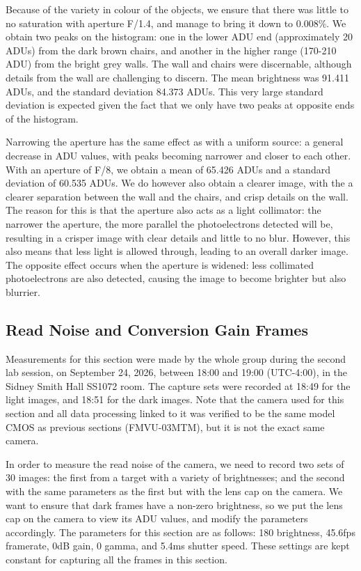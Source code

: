 \documentclass[preprint2]{aastex702}
\begin{document}
			Because of the variety in colour of the objects, we ensure that there was little to no saturation with aperture F/1.4, and manage to bring it down to 0.008\%. We obtain two peaks on the histogram: one in the lower ADU end (approximately 20 ADUs) from the dark brown chairs, and another in the higher range (170-210 ADU) from the bright grey walls. The wall and chairs were discernable, although details from the wall are challenging to discern. The mean brightness was 91.411 ADUs, and the standard deviation 84.373 ADUs. This very large standard deviation is expected given the fact that we only have two peaks at opposite ends of the histogram.

			Narrowing the aperture has the same effect as with a uniform source: a general decrease in ADU values, with peaks becoming narrower and closer to each other. With an aperture of F/8, we obtain a mean of 65.426 ADUs and a standard deviation of 60.535 ADUs. We do however also obtain a clearer image, with the a clearer separation between the wall and the chairs, and crisp details on the wall. The reason for this is that the aperture also acts as a light collimator: the narrower the aperture, the more parallel the photoelectrons detected will be, resulting in a crisper image with clear details and little to no blur. However, this also means that less light is allowed through, leading to an overall darker image. The opposite effect occurs when the aperture is widened: less collimated photoelectrons are also detected, causing the image to become brighter but also blurrier.

		\subsection{Read Noise and Conversion Gain Frames}\label{ssec:4.2.4}

			Measurements for this section were made by the whole group during the second lab session, on September 24, 2026, between 18:00 and 19:00 (UTC-4:00), in the Sidney Smith Hall SS1072 room. The capture sets were recorded at 18:49 for the light images, and 18:51 for the dark images. Note that the camera used for this section and all data processing linked to it was verified to be the same model CMOS as previous sections (FMVU-03MTM), but it is not the exact same camera.

			In order to measure the read noise of the camera, we need to record two sets of 30 images: the first from a target with a variety of brightnesses; and the second with the same parameters as the first but with the lens cap on the camera. We want to ensure that dark frames have a non-zero brightness, so we put the lens cap on the camera to view its ADU values, and modify the parameters accordingly. The parameters for this section are as follows: 180 brightness, 45.6fps framerate, 0dB gain, 0 gamma, and 5.4ms shutter speed. These settings are kept constant for capturing all the frames in this section.
\end{document}
